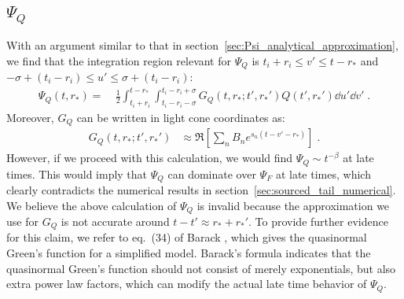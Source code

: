 \documentclass[reprint,aps,physrev,superscriptaddress,10pt,notitlepage,prd,nofootinbib,onecolumn]{revtex4-2}
\newcommand{\sref}[1]{section~\ref{#1}}
\begin{document}
\subsection{$\Psi_Q$}
\label{sec:Psi_Q_details}
With an argument similar to that in \sref{sec:Psi_analytical_approximation}, we find that the integration region relevant for $\Psi_Q$ is $t_i + r_i \leq v' \leq t - r_*$ and $-\sigma + (t_i-r_i) \leq u' \leq \sigma + (t_i-r_i)$:
\begin{align}
  \label{eq:Psi_Q_integral_u_v}
  \Psi_Q(t,r_*)
  = & \  \frac12 \int_{t_i+r_i}^{t-r_*} \int_{t_i-r_i-\sigma}^{t_i-r_i+\sigma} G_Q(t,r_*; t', r_*') Q(t',r_*') \dd{u'} \dd{v'} \;.
\end{align}
Moreover, $G_Q$ can be written in light cone coordinates as:
\begin{align}
  G_Q(t,r_*;t',r_*') &\approx %
                       \Re \left[ \sum_n B_n e^{s_n (t-v'-r_*)} \right] \;.
\end{align}
However, if we proceed with this calculation, we would find $\Psi_Q \sim t^{-\beta}$ at late times.
This would imply that $\Psi_Q$ can dominate over $\Psi_F$ at late times, which clearly contradicts the numerical results in \sref{sec:sourced_tail_numerical}.
We believe the above calculation of $\Psi_Q$ is invalid because the approximation we use for $G_Q$ is not accurate around $t - t' \approx r_* + r_*'$.
To provide further evidence for this claim, we refer to eq.~(34) of Barack \cite{Barack:1998bw}, which gives the quasinormal Green's function for a simplified model.
Barack's formula indicates that the quasinormal Green's function should not consist of merely exponentials, but also extra power law factors, which can modify the actual late time behavior of $\Psi_Q$.
\end{document}
